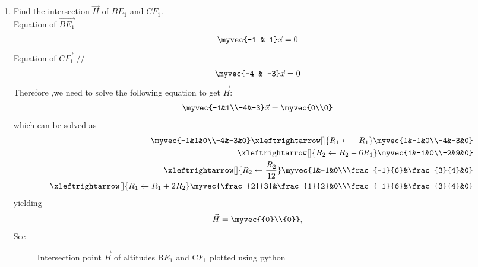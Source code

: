 \documentclass[11pt]{book}
\begin{document}
\begin{enumerate}[label=\thesection.\arabic*.,ref=\thesection.\theenumi]
\item Find the intersection $\vec{H}$ of $BE_1$ and $CF_1$.
 \\  \solution Equation of $\vec{BE_1}$ \\
\begin{align}
    \myvec{-1 & 1}\vec{x}&= 0
\end{align}
Equation of $\vec{CF_1}$ //
\begin{align}
    \myvec{-4 & -3}\vec{x}&=0
\end{align}
Therefore ,we need to solve the following equation to get $\vec{H}:$ \\
\begin{align}
        \myvec{-1&1\\-4&-3} \vec{x} &= \myvec{0\\0}
\end{align}
%
which can be solved as 
%
\begin{align}
        \myvec{-1&1&0\\-4&-3&0}
	 \xleftrightarrow[]{R_1 \leftarrow - R_1}
        \myvec{1&-1&0\\-4&-3&0}\\
	 \xleftrightarrow[]{R_2 \leftarrow R_2-6R_1}
        \myvec{1&-1&0\\-2&9&0} \\
	 \xleftrightarrow[]{R_2 \leftarrow \frac{R_2}{12}}
        \myvec{1&-1&0\\\frac{-1}{6}&\frac{3}{4}&0} \\
         \xleftrightarrow[]{R_1 \leftarrow R_1+2R_2}
            \myvec{\frac{2}{3}&\frac{1}{2}&0\\\frac{-1}{6}&\frac{3}{4}&0}
\end{align}
%
yielding
%
\begin{align}
        \vec{H}&=\myvec{{0}\\{0}}
		\label{eq:geo-alt-H},
\end{align}
%
See 
\begin{figure}[H]
\centering
\caption{Intersection point $\vec{H}$ of altitudes B$E_{1}$ and C$F_{1}$ plotted using python}
\label{fig:m_tri_py}
\end{figure}


\end{enumerate}
\end{document}
